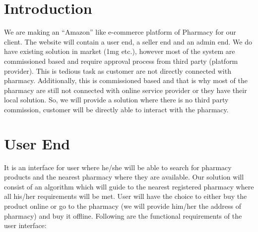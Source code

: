 \documentclass[fleqn,10pt]{SelfArx} %
\affiliation{\textit{D-Enigma (Group - CS 01)}} %
\affiliation{\textit{Indian Institute of Information Technology, Vadodara.}} %
\begin{document}
\sffamily
\flushbottom %

\maketitle %

\tableofcontents %

\thispagestyle{empty} %


\section*{Introduction} %


We are making an “Amazon” like e-commerce platform of Pharmacy for our client. The website will contain a user end, a seller end and an admin end. We do have existing solution in market (1mg etc.), however most of the system are commissioned based and require approval process from third party (platform provider). This is tedious task as customer are not directly connected with pharmacy. Additionally, this is commissioned based and that is why most of the pharmacy are still not connected with online service provider or they have their local solution. So, we will provide a solution where there is no third party commission, customer will be directly able to interact with the pharmacy.


\section{User End}

It is an interface for user where he/she will be able to search for pharmacy products and the nearest pharmacy where they are available. Our solution will consist of an algorithm which will guide to the nearest registered pharmacy where all his/her requirements will be met. User will have the choice to either buy the product online or go to the pharmacy (we will provide him/her the address of pharmacy) and buy it offline. Following are the functional requirements of the user interface:
\end{document}
